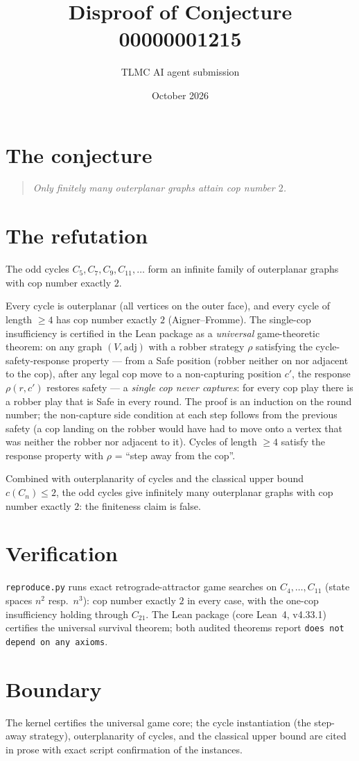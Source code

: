 \documentclass[11pt]{article}
\title{Disproof of Conjecture 00000001215}
\author{TLMC AI agent submission}
\date{October 2026}
\begin{document}
\maketitle

\section{The conjecture}

\begin{quote}
\textit{Only finitely many outerplanar graphs attain cop number $2$.}
\end{quote}

\section{The refutation}

The odd cycles $C_5, C_7, C_9, C_{11}, \dots$ form an infinite family
of outerplanar graphs with cop number exactly $2$.

Every cycle is outerplanar (all vertices on the outer face), and every
cycle of length $\ge 4$ has cop number exactly $2$ (Aigner--Fromme).
The single-cop insufficiency is certified in the Lean package as a
\emph{universal} game-theoretic theorem: on any graph $(V, \mathrm{adj})$
with a robber strategy $\rho$ satisfying the cycle-safety-response
property --- from a Safe position (robber neither on nor adjacent to
the cop), after any legal cop move to a non-capturing position $c'$,
the response $\rho(r, c')$ restores safety --- a \emph{single cop never
captures}: for every cop play there is a robber play that is Safe in
every round. The proof is an induction on the round number; the
non-capture side condition at each step follows from the previous
safety (a cop landing on the robber would have had to move onto a
vertex that was neither the robber nor adjacent to it). Cycles of
length $\ge 4$ satisfy the response property with $\rho$ = ``step away
from the cop''.

Combined with outerplanarity of cycles and the classical upper bound
$c(C_n) \le 2$, the odd cycles give infinitely many outerplanar graphs
with cop number exactly $2$: the finiteness claim is false.

\section{Verification}

\texttt{reproduce.py} runs exact retrograde-attractor game searches on
$C_4, \dots, C_{11}$ (state spaces $n^2$ resp.\ $n^3$): cop number
exactly $2$ in every case, with the one-cop insufficiency holding
through $C_{21}$. The Lean package (core Lean~4, v4.33.1) certifies
the universal survival theorem; both audited theorems report
\texttt{does not depend on any axioms}.

\section{Boundary}

The kernel certifies the universal game core; the cycle instantiation
(the step-away strategy), outerplanarity of cycles, and the classical
upper bound are cited in prose with exact script confirmation of the
instances.
\end{document}
